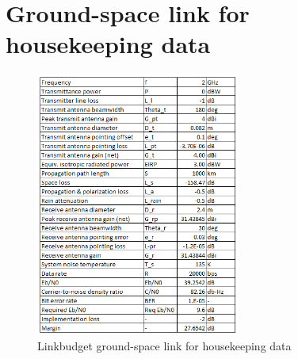 \newpage
\section{Ground-space link for housekeeping data}
\begin{figure}[ht]
\centering
\includegraphics[width=0.6\textwidth, angle=0]{img/GShousekeepinglinkbudget.png}
\caption{Linkbudget ground-space link for housekeeping data}
\label{figSSbudget}
\end{figure}

